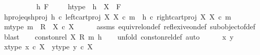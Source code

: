 \begin{isabellebody}
\ \ \isamarkupfalse%
\ \ \ \isanewline
{}\isamarkupfalse%
\isanewline
\ \ \isamarkupfalse%
\ h\ F\ \isanewline
\ \ \isamarkupfalse%
\ h{\isacharunderscore}{\kern0pt}type{\isacharcolon}{\kern0pt}\ {\isachardoublequoteopen}\ h\ {\isacharcolon}{\kern0pt}\ X\ {\isasymrightarrow}\ F{\isachardoublequoteclose}\isanewline
\ \ \isamarkupfalse%
\ h{\isacharunderscore}{\kern0pt}proj{}{\isacharunderscore}{\kern0pt}eqs{\isacharunderscore}{\kern0pt}h{\isacharunderscore}{\kern0pt}proj{}{\isacharcolon}{\kern0pt}\ {\isachardoublequoteopen}h\ {\isasymcirc}\isactrlsub c\ left{\isacharunderscore}{\kern0pt}cart{\isacharunderscore}{\kern0pt}proj\ X\ X\ {\isasymcirc}\isactrlsub c\ m\ {\isacharequal}{\kern0pt}\ h\ {\isasymcirc}\isactrlsub c\ right{\isacharunderscore}{\kern0pt}cart{\isacharunderscore}{\kern0pt}proj\ X\ X\ {\isasymcirc}\isactrlsub c\ m{\isachardoublequoteclose}\isanewline
\isanewline
\ \ \isamarkupfalse%
\ m{\isacharunderscore}{\kern0pt}type{\isacharcolon}{\kern0pt}\ {\isachardoublequoteopen}m\ {\isacharcolon}{\kern0pt}\ R\ {\isasymrightarrow}\ X\ {\isasymtimes}\isactrlsub c\ X{\isachardoublequoteclose}\isanewline
\ \ \ \ \isamarkupfalse%
\ assms\ equiv{\isacharunderscore}{\kern0pt}rel{\isacharunderscore}{\kern0pt}on{\isacharunderscore}{\kern0pt}def\ reflexive{\isacharunderscore}{\kern0pt}on{\isacharunderscore}{\kern0pt}def\ subobject{\isacharunderscore}{\kern0pt}of{\isacharunderscore}{\kern0pt}def{}\ \isamarkupfalse%
\ blast\isanewline
\ \ \isamarkupfalse%
\ {\isachardoublequoteopen}const{\isacharunderscore}{\kern0pt}on{\isacharunderscore}{\kern0pt}rel\ X\ {\isacharparenleft}{\kern0pt}R{\isacharcomma}{\kern0pt}\ m{\isacharparenright}{\kern0pt}\ h{\isachardoublequoteclose}\isanewline
\ \ \isamarkupfalse%
\ {\isacharparenleft}{\kern0pt}unfold\ const{\isacharunderscore}{\kern0pt}on{\isacharunderscore}{\kern0pt}rel{\isacharunderscore}{\kern0pt}def{\isacharcomma}{\kern0pt}\ auto{\isacharparenright}{\kern0pt}\isanewline
\ \ \ \ \isamarkupfalse%
\ x\ y\isanewline
\ \ \ \ \isamarkupfalse%
\ x{\isacharunderscore}{\kern0pt}type{\isacharcolon}{\kern0pt}\ {\isachardoublequoteopen}x\ {\isasymin}\isactrlsub c\ X{\isachardoublequoteclose}\ \ y{\isacharunderscore}{\kern0pt}type{\isacharcolon}{\kern0pt}\ {\isachardoublequoteopen}y\ {\isasymin}\isactrlsub c\ X{\isachardoublequoteclose}\isanewline
\ \ \ \ \isamarkupfalse%

\end{isabellebody}
